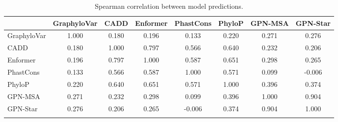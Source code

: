 \begin{table}[htbp]
\centering
\small
\caption{Spearman correlation between model predictions.}
\label{tab:spearman_corr}
\begin{tabular}{lccccccc}
\toprule
& GraphyloVar & CADD & Enformer & PhastCons & PhyloP & GPN-MSA & GPN-Star \\
\midrule
GraphyloVar & 1.000 & 0.180 & 0.196 & 0.133 & 0.220 & 0.271 & 0.276 \\
CADD & 0.180 & 1.000 & 0.797 & 0.566 & 0.640 & 0.232 & 0.206 \\
Enformer & 0.196 & 0.797 & 1.000 & 0.587 & 0.651 & 0.298 & 0.265 \\
PhastCons & 0.133 & 0.566 & 0.587 & 1.000 & 0.571 & 0.099 & -0.006 \\
PhyloP & 0.220 & 0.640 & 0.651 & 0.571 & 1.000 & 0.396 & 0.374 \\
GPN-MSA & 0.271 & 0.232 & 0.298 & 0.099 & 0.396 & 1.000 & 0.904 \\
GPN-Star & 0.276 & 0.206 & 0.265 & -0.006 & 0.374 & 0.904 & 1.000 \\
\botrule
\end{tabular}
\end{table}
